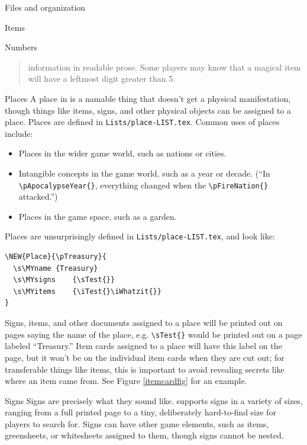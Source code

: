 \documentclass[sheet]{GameTexBase}
\begin{document}
\begin{section}{Files and organization}
\begin{subsection}{Items}
\begin{subsubsection}{Numbers}
\begin{quote}
information in readable prose. Some players may know that a magical item will have a
leftmost digit greater than 5.
\end{quote}
\end{subsubsection}
\end{subsection}
\begin{subsection}{Places}
A place in \gametex{} is a namable thing that doesn't get a physical manifestation, though things like
items, signs, and other physical objects can be assigned to a place.  Places are defined in \lstinline|Lists/place-LIST.tex|.  Common uses of places include:

\begin{itemize}
\item Places in the wider game world, such as nations or cities.
\item Intangible concepts in the game world, such as a year or decade.  (``In \lstinline|\pApocalypseYear{}|, everything changed when the \lstinline|\pFireNation{}| attacked.'')
\item Places in the game space, such as a garden.  
\end{itemize}

Places are unsurprisingly defined in \lstinline|Lists/place-LIST.tex|, and look like:
\begin{verbatim}
\NEW{Place}{\pTreasury}{
  \s\MYname	{Treasury}
  \s\MYsigns	{\sTest{}}
  \s\MYitems	{\iTest{}\iWhatzit{}}
}
\end{verbatim}

Signs, items, and other documents assigned to a place will be printed out on pages saying the name of the place, e.g. \lstinline|\sTest{}| would be printed out on a page labeled ``Treasury.'' 
Item cards assigned to a place will have this label on the page, but it won't be on the individual item cards when they are cut out; for transferable things like items, this is important to avoid revealing secrets like where an item came from.  See Figure \ref{itemcardfig} for an example.
\end{subsection}
\begin{subsection}{Signs}
Signs are precisely what they sound like.  \gametex{} supports signs in a variety of sizes, ranging from a full printed page to a tiny, deliberately hard-to-find size for players to search for.
Signs can have other game elements, such as items, greensheets, or whitesheets assigned to them, though signs cannot be nested.


\end{subsection}
\end{section}
\end{document}
